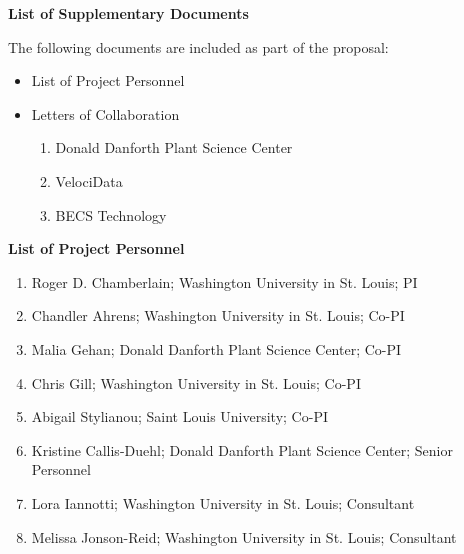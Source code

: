 \documentclass[11pt]{article}
\begin{document}
\pagestyle{empty}
\thispagestyle{empty}

\begin{center}
\textbf{\Large List of Supplementary Documents}
\end{center}

The following documents are included as part of the proposal:

\begin{itemize}

\item List of Project Personnel

\item Letters of Collaboration

\begin{enumerate}

\item Donald Danforth Plant Science Center

\item VelociData

\item BECS Technology

\end{enumerate}

\end{itemize}

\newpage

\begin{center}
\textbf{\Large List of Project Personnel}
\end{center}

\begin{enumerate}

\item Roger D. Chamberlain; Washington University in St. Louis; PI

\item Chandler Ahrens; Washington University in St. Louis; Co-PI

\item Malia Gehan; Donald Danforth Plant Science Center; Co-PI

\item Chris Gill; Washington University in St. Louis; Co-PI

\item Abigail Stylianou; Saint Louis University; Co-PI

\item Kristine Callis-Duehl; Donald Danforth Plant Science Center; Senior Personnel

\item Lora Iannotti; Washington University in St. Louis; Consultant

\item Melissa Jonson-Reid; Washington University in St. Louis; Consultant

\end{enumerate}
\end{document}
